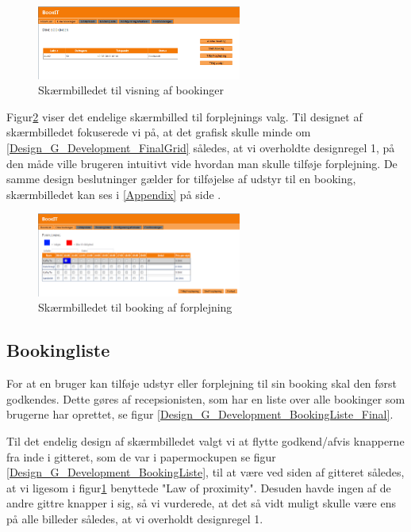 \begin{figure}[h!]
  \centering
    \includegraphics[width=0.6\textwidth]{Appendix/GUI-Prototype/DigitalMockup/DineBookinger}
  \caption{Skærmbilledet til visning af bookinger}
\label{Design_G_Development_YourBookings_Final}
\end{figure} 

Figur\ref{Design_G_Development_Forplejning_Final} viser det endelige skærmbilled til forplejnings valg. Til designet af skærmbilledet fokuserede vi på, at det grafisk skulle minde om \ref{Design_G_Development_FinalGrid} således, at vi overholdte designregel 1, på den måde ville brugeren intuitivt vide hvordan man skulle tilføje forplejning. De samme design beslutninger gælder for tilføjelse af udstyr til en booking, skærmbilledet kan ses i  \ref{Appendix} på side \pageref{Appendix}.

\begin{figure}[h!]
  \centering
    \includegraphics[width=0.6\textwidth]{Appendix/GUI-Prototype/DigitalMockup/Forplejning}
  \caption{Skærmbilledet til booking af forplejning}
\label{Design_G_Development_Forplejning_Final}
\end{figure} 

\subsection{Bookingliste}
For at en bruger kan tilføje udstyr eller forplejning til sin booking skal den først godkendes. Dette gøres af recepsionisten, som har en liste over alle bookinger som brugerne har oprettet, se figur \ref{Design_G_Development_BookingListe_Final}.

Til det endelig design af skærmbilledet valgt vi at flytte godkend/afvis knapperne fra inde i gitteret, som de var i papermockupen se figur \ref{Design_G_Development_BookingListe}, til at være ved siden af gitteret således, at vi ligesom i figur\ref{Design_G_Development_YourBookings_Final} benyttede "Law of proximity". Desuden havde ingen af de andre gittre knapper i sig, så vi vurderede, at det så vidt muligt skulle være ens på alle billeder således, at vi overholdt designregel 1.

